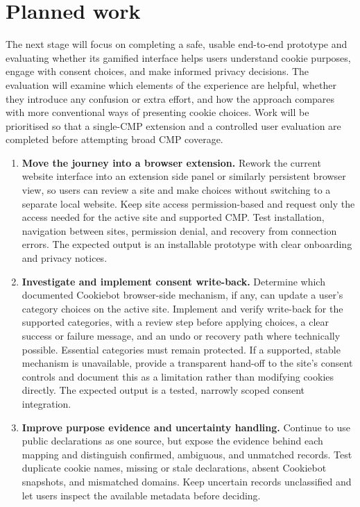 \documentclass[11pt,a4paper]{report}
\begin{document}
\section{Planned work}
The next stage will focus on completing a safe, usable end-to-end prototype and evaluating whether its gamified interface helps users understand cookie purposes, engage with consent choices, and make informed privacy decisions. The evaluation will examine which elements of the experience are helpful, whether they introduce any confusion or extra effort, and how the approach compares with more conventional ways of presenting cookie choices. Work will be prioritised so that a single-CMP extension and a controlled user evaluation are completed before attempting broad CMP coverage.
\begin{enumerate}
  \item \textbf{Move the journey into a browser extension.} Rework the current website interface into an extension side panel or similarly persistent browser view, so users can review a site and make choices without switching to a separate local website. Keep site access permission-based and request only the access needed for the active site and supported CMP. Test installation, navigation between sites, permission denial, and recovery from connection errors. The expected output is an installable prototype with clear onboarding and privacy notices.

  \item \textbf{Investigate and implement consent write-back.} Determine which documented Cookiebot browser-side mechanism, if any, can update a user's category choices on the active site. Implement and verify write-back for the supported categories, with a review step before applying choices, a clear success or failure message, and an undo or recovery path where technically possible. Essential categories must remain protected. If a supported, stable mechanism is unavailable, provide a transparent hand-off to the site's consent controls and document this as a limitation rather than modifying cookies directly. The expected output is a tested, narrowly scoped consent integration.

  \item \textbf{Improve purpose evidence and uncertainty handling.} Continue to use public declarations as one source, but expose the evidence behind each mapping and distinguish confirmed, ambiguous, and unmatched records. Test duplicate cookie names, missing or stale declarations, absent Cookiebot snapshots, and mismatched domains. Keep uncertain records unclassified and let users inspect the available metadata before deciding. 


\end{enumerate}
\end{document}
